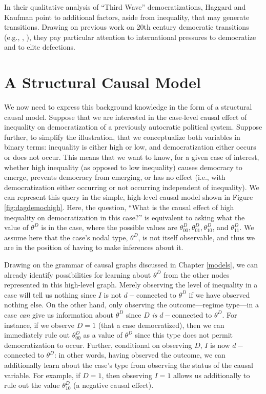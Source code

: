\documentclass[
  12pt,
]{book}
\begin{document}
In their qualitative analysis of ``Third Wave'' democratizations, Haggard and Kaufman point to additional factors, aside from inequality, that may generate transitions. Drawing on previous work on 20th century democratic transitions (e.g., \citet{huntington1993third}, \citet{linz1996problems}), they pay particular attention to international pressures to democratize and to elite defections.

\hypertarget{a-structural-causal-model}{%
\section{A Structural Causal Model}\label{a-structural-causal-model}}

We now need to express this background knowledge in the form of a structural causal model. Suppose that we are interested in the case-level causal effect of inequality on democratization of a previously autocratic political system. Suppose further, to simplify the illustration, that we conceptualize both variables in binary terms: inequality is either high or low, and democratization either occurs or does not occur. This means that we want to know, for a given case of interest, whether high inequality (as opposed to low inequality) causes democracy to emerge, prevents democracy from emerging, or has no effect (i.e., with democratization either occurring or not occurring independent of inequality). We can represent this query in the simple, high-level causal model shown in Figure \ref{fig:dagdemochigh}. Here, the question, ``What is the causal effect of high inequality on democratization in this case?'' is equivalent to asking what the value of \(\theta^D\) is in the case, where the possible values are \(\theta_{00}^D, \theta_{01}^D, \theta_{10}^D\), and \(\theta_{11}^D\). We assume here that the case's nodal type, \(\theta^D\), is not itself observable, and thus we are in the position of having to make inferences about it.

Drawing on the grammar of causal graphs discussed in Chapter \ref{models}, we can already identify possibilities for learning about \(\theta^D\) from the other nodes represented in this high-level graph. Merely observing the level of inequality in a case will tell us nothing since \(I\) is not \(d-\)connected to \(\theta^D\) if we have observed nothing else. On the other hand, only observing the outcome---regime type---in a case \emph{can} give us information about \(\theta^D\) since \(D\) \emph{is} \(d-\)connected to \(\theta^D\). For instance, if we observe \(D=1\) (that a case democratized), then we can immediately rule out \(\theta_{00}^D\) as a value of \(\theta^D\) since this type does not permit democratization to occur. Further, conditional on observing \(D\), \(I\) is now \(d-\)connected to \(\theta^D\): in other words, having observed the outcome, we can additionally learn about the case's type from observing the status of the causal variable. For example, if \(D=1\), then observing \(I=1\) allows us additionally to rule out the value \(\theta_{10}^D\) (a negative causal effect).
\end{document}
